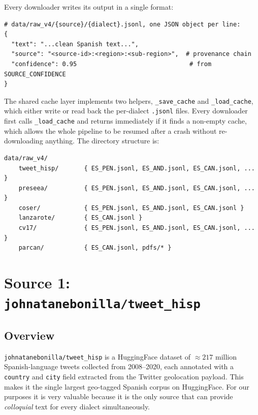 \documentclass[11pt,a4paper]{article}
\begin{document}
Every downloader writes its output in a single format:

\begin{lstlisting}[style=pycode,caption={Shared output schema for all six sources (from \texttt{downloader\_v45.py}).}]
# data/raw_v4/{source}/{dialect}.jsonl, one JSON object per line:
{
  "text": "...clean Spanish text...",
  "source": "<source-id>:<region>:<sub-region>",  # provenance chain
  "confidence": 0.95                               # from SOURCE_CONFIDENCE
}
\end{lstlisting}

The shared cache layer implements two helpers, \texttt{\_save\_cache} and
\texttt{\_load\_cache}, which either write or read back the per-dialect
\texttt{.jsonl} files. Every downloader first calls \texttt{\_load\_cache}
and returns immediately if it finds a non-empty cache, which allows the
whole pipeline to be resumed after a crash without re-downloading
anything. The directory structure is:

\begin{lstlisting}[style=shellcode]
data/raw_v4/
    tweet_hisp/       { ES_PEN.jsonl, ES_AND.jsonl, ES_CAN.jsonl, ... }
    preseea/          { ES_PEN.jsonl, ES_AND.jsonl, ES_CAN.jsonl, ... }
    coser/            { ES_PEN.jsonl, ES_AND.jsonl, ES_CAN.jsonl }
    lanzarote/        { ES_CAN.jsonl }
    cv17/             { ES_PEN.jsonl, ES_AND.jsonl, ES_CAN.jsonl, ... }
    parcan/           { ES_CAN.jsonl, pdfs/* }
\end{lstlisting}

\section{Source 1: \texttt{johnatanebonilla/tweet\_hisp}}

\subsection{Overview}

\texttt{johnatanebonilla/tweet\_hisp} is a HuggingFace dataset of
$\approx 217$ million Spanish-language tweets collected from 2008--2020,
each annotated with a \texttt{country} and \texttt{city} field extracted
from the Twitter geolocation payload. This makes it the single largest
geo-tagged Spanish corpus on HuggingFace. For our purposes it is very
valuable because it is the only source that can provide \emph{colloquial}
text for every dialect simultaneously.
\end{document}

